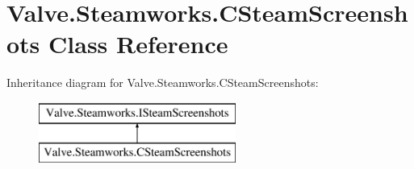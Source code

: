 \hypertarget{classValve_1_1Steamworks_1_1CSteamScreenshots}{}\section{Valve.\+Steamworks.\+C\+Steam\+Screenshots Class Reference}
\label{classValve_1_1Steamworks_1_1CSteamScreenshots}
Inheritance diagram for Valve.\+Steamworks.\+C\+Steam\+Screenshots\+:\begin{figure}[H]
\begin{center}
\leavevmode
\includegraphics[height=2.000000cm]{classValve_1_1Steamworks_1_1CSteamScreenshots}
\end{center}
\end{figure}
